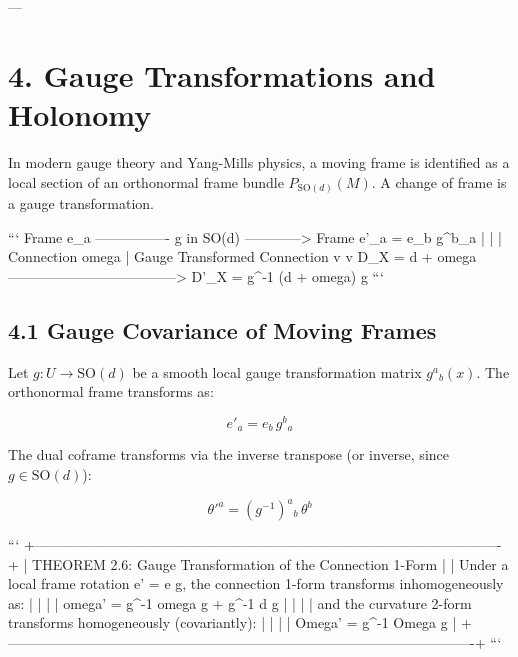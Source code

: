 \documentclass[11pt,twoside,openright]{amsbook}
\begin{document}
{{{{{{---

\section{4. Gauge Transformations and Holonomy}

In modern gauge theory and Yang-Mills physics, a moving frame is identified as a local section of an orthonormal frame bundle $P_{\mathrm{SO}(d)}(M)$. A change of frame is a gauge transformation.

```
       Frame e_a ---------------- g in SO(d) ------------> Frame e'_a = e_b g^b_a
           |                                                      |
           | Connection omega                                     | Gauge Transformed Connection
           v                                                      v
       D_X = d + omega ------------------------------------> D'_X = g^{-1} (d + omega) g
```

\subsection{4.1 Gauge Covariance of Moving Frames}

Let $g : U \to \mathrm{SO}(d)$ be a smooth local gauge transformation matrix $g^a{}_b(x)$. The orthonormal frame transforms as:

$$e'_a = e_b \, g^b{}_a$$

The dual coframe transforms via the inverse transpose (or inverse, since $g \in \mathrm{SO}(d)$):

$$\theta'^a = (g^{-1})^a{}_b \, \theta^b$$

```
+----------------------------------------------------------------------------------------------------+
| THEOREM 2.6: Gauge Transformation of the Connection 1-Form                                         |
| Under a local frame rotation e' = e g, the connection 1-form transforms inhomogeneously as:        |
|                                                                                                    |
|   omega' = g^{-1} omega g + g^{-1} d g                                                             |
|                                                                                                    |
| and the curvature 2-form transforms homogeneously (covariantly):                                   |
|                                                                                                    |
|   Omega' = g^{-1} Omega g                                                                          |
+----------------------------------------------------------------------------------------------------+
```

}}}}}}
\end{document}
